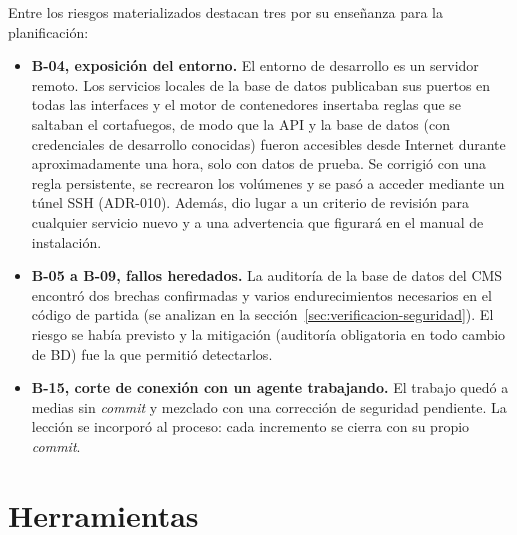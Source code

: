 
Entre los riesgos materializados destacan tres por su enseñanza para la
planificación:

\begin{itemize}
  \item \textbf{B-04, exposición del entorno.} El entorno de desarrollo es un
        servidor remoto. Los servicios locales de la base de datos publicaban
        sus puertos en todas las interfaces y el motor de contenedores
        insertaba reglas que se saltaban el cortafuegos, de modo que la API y
        la base de datos (con credenciales de desarrollo conocidas) fueron
        accesibles desde Internet durante aproximadamente una hora, solo con
        datos de prueba. Se corrigió con una regla persistente, se recrearon
        los volúmenes y se pasó a acceder mediante un túnel SSH (ADR-010).
        Además, dio lugar a un criterio de revisión para cualquier servicio
        nuevo y a una advertencia que figurará en el manual de instalación.
  \item \textbf{B-05 a B-09, fallos heredados.} La auditoría de la base de
        datos del CMS encontró dos brechas confirmadas y varios
        endurecimientos necesarios en el código de partida (se analizan en la
        sección~\ref{sec:verificacion-seguridad}). El riesgo se había previsto
        y la mitigación (auditoría obligatoria en todo cambio de BD) fue la
        que permitió detectarlos.
  \item \textbf{B-15, corte de conexión con un agente trabajando.} El trabajo
        quedó a medias sin \textit{commit} y mezclado con una corrección de
        seguridad pendiente. La lección se incorporó al proceso: cada
        incremento se cierra con su propio \textit{commit}.
\end{itemize}

\section{Herramientas}
\label{sec:herramientas}

